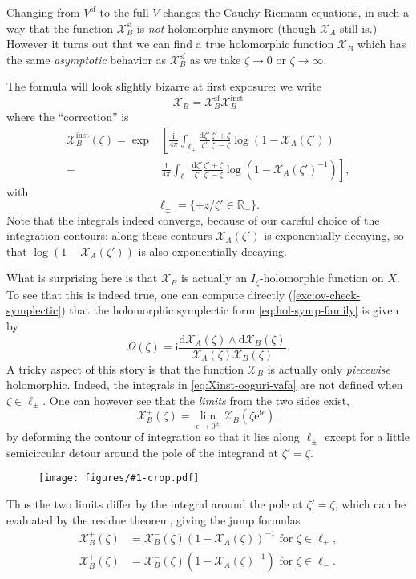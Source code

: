 \documentclass[12pt,letterpaper,reqno]{article}
\numberwithin{equation}{section}
\newcommand{\cX}{\ensuremath{\mathcal X}}
\newcommand{\R}{\ensuremath{\mathbb R}}
\newcommand{\I}{{\mathrm i}}
\newcommand{\e}{{\mathrm e}}
\newcommand{\de}{\mathrm{d}}
\renewcommand{\sf}{\mathrm{sf}}
\newcommand{\inst}{\mathrm{inst}}
\newcommand{\eps}{\epsilon}
\newcommand{\ti}[1]{\textit{#1}}
\newcommand{\insfig}[2]{\begin{figure}[htbp] \centering \texttt{[image: figures/\#1-crop.pdf]} \label{fig:#1} \end{figure}}
\begin{document}
\begin{example}
Changing from $V^\sf$ to the full $V$
changes the Cauchy-Riemann equations, in such a way 
that the function $\cX_B^\sf$ is \ti{not} holomorphic anymore
(though $\cX_A$ still is.)
However it turns out that we can
find a true holomorphic function $\cX_B$ which has the same \ti{asymptotic}
behavior as $\cX_B^\sf$ as we take $\zeta \to 0$ or $\zeta\to\infty$.

The formula will look slightly bizarre at first exposure:
we write
\begin{equation}
  \cX_B = \cX_B^{\sf} \cX_B^{\inst}
\end{equation}
where the ``correction'' is
\begin{align} \label{eq:Xinst-ooguri-vafa}
  \cX_B^\inst(\zeta) = \exp & \left[ \frac{\I}{4 \pi} \int_{\ell_+} \frac{\de \zeta'}{\zeta'} \frac{\zeta' + \zeta}{\zeta' - \zeta} \log(1 - \cX_A(\zeta')) \right. \\
  - & \left. \frac{\I}{4 \pi} \int_{\ell_-} \frac{\de \zeta'}{\zeta'} \frac{\zeta' + \zeta}{\zeta' - \zeta} \log(1 - \cX_A(\zeta')^{-1}) \right],
\end{align}
with 
\begin{equation}
  \ell_\pm = \{ \pm z/\zeta' \in \R_- \}.
\end{equation}
Note that the integrals indeed converge, because of our careful choice
of the integration contours: along these contours $\cX_A(\zeta')$ is 
exponentially decaying, so that $\log(1 - \cX_A(\zeta'))$ is also
exponentially decaying.

What is surprising here is that $\cX_B$
is actually an $I_\zeta$-holomorphic function on $X$.
To see that this is indeed true,
one can compute directly (\autoref{exc:ov-check-symplectic}) 
that the holomorphic symplectic form \eqref{eq:hol-symp-family}
is given by
\begin{equation} \label{eq:hol-symp-ooguri-vafa}
  \Omega(\zeta) = \I \frac{\de \cX_A(\zeta) \wedge \de \cX_B(\zeta)}{\cX_A(\zeta) \cX_B(\zeta)}.
\end{equation}
A tricky aspect of this story is that the function $\cX_B$ is 
actually only \ti{piecewise} holomorphic. Indeed, the integrals
in \eqref{eq:Xinst-ooguri-vafa} are not defined when $\zeta \in \ell_\pm$.
One can however see that the \ti{limits} from the two sides exist, 
\begin{equation}
  \cX_B^\pm(\zeta) = \lim_{\eps \to 0^\pm} \cX_B(\zeta \e^{\I \eps}),
\end{equation}
by deforming the contour of integration so that it lies along
$\ell_\pm$ except for a little semicircular detour around the
pole of the integrand at $\zeta' = \zeta$.
\insfig{higgs-bundles-9}{0.8}
Thus the two limits differ by the integral around the pole
at $\zeta' = \zeta$, which can be evaluated by the residue theorem,
giving the jump formulas
\begin{align}
  \cX_B^+(\zeta) &= \cX_B^-(\zeta)(1 - \cX_A(\zeta))^{-1} \text{ for } \zeta \in \ell_+, \label{eq:ooguri-vafa-cluster-1} \\
  \cX_B^+(\zeta) &= \cX_B^-(\zeta)(1 - \cX_A(\zeta)^{-1}) \text{ for } \zeta \in \ell_-. \label{eq:ooguri-vafa-cluster-2}
\end{align}


\end{example}
\end{document}
